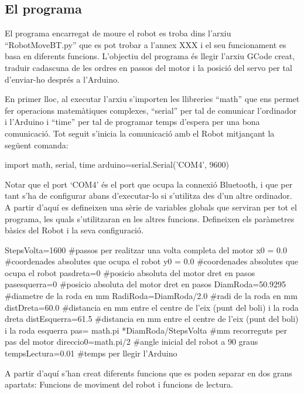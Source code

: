 \subsection{El programa}

El programa encarregat de moure el robot es troba dins l’arxiu “RobotMoveBT.py” que es pot trobar a l’annex XXX i el seu funcionament es basa en diferents funcions. L’objectiu del programa és llegir l’arxiu GCode creat, traduir cadascuna de les ordres en passos del motor i la posició del servo per tal d’enviar-ho després a l’Arduino. 

En primer lloc, al executar l’arxiu s’importen les llibreries “math” que ens permet fer operacions matemàtiques complexes, “serial” per tal de comunicar l’ordinador i l’Arduino i “time” per tal de programar temps d’espera per una bona comunicació. Tot seguit s’inicia la comunicació amb el Robot mitjançant la següent comanda:

\begin{python}
	import math, serial, time
	arduino=serial.Serial('COM4', 9600)
\end{python}

Notar que el port ‘COM4’ és el port que ocupa la connexió Bluetooth, i que per tant s’ha de configurar abans d’executar-lo si s’utilitza des d’un altre ordinador. 
A partir d’aquí es defineixen una sèrie de variables globals que serviran per tot el programa, les quals s’utilitzaran en les altres funcions. Defineixen els paràmetres bàsics del Robot i la seva configuració. 

\begin{python}
	StepsVolta=1600  #passos per realitzar una volta completa del motor
	x0 = 0.0  #coordenades absolutes que ocupa el robot
	y0 = 0.0  #coordenades absolutes que ocupa el robot
	pasdreta=0  #posicio absoluta del motor dret en pasos
	pasesquerra=0  #posicio absoluta del motor dret en pasos
	DiamRoda=50.9295  #diametre de la roda en mm
	RadiRoda=DiamRoda/2.0  #radi de la roda en mm
	distDreta=60.0  #distancia en mm entre el centre de l'eix (punt del boli) i la roda dreta
	distEsquerra=61.5  #distancia en mm entre el centre de l'eix (punt del boli) i la roda esquerra
	pas= math.pi *DiamRoda/StepsVolta  #mm recorreguts per pas del motor
	direccio0=math.pi/2  #angle inicial del robot a 90 graus
	tempsLectura=0.01  #temps per llegir l'Arduino 
\end{python}


A partir d’aquí s’han creat diferents funcions que es poden separar en dos grans apartats: Funcions de moviment del robot i funcions de lectura. 

